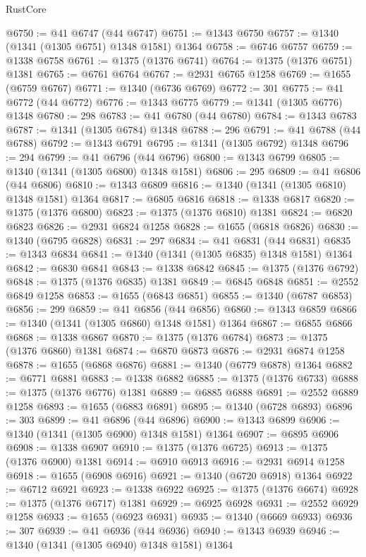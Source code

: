 \begin{lexlean}{RustCore}
\begin{coremodule}
@6750 := @41 @6747 (@44 @6747)
@6751 := @1343 @6750
@6757 := @1340 (@1341 (@1305 @6751) @1348 @1581) @1364
@6758 := @6746 @6757
@6759 := @1338 @6758
@6761 := @1375 (@1376 @6741)
@6764 := @1375 (@1376 @6751) @1381
@6765 := @6761 @6764
@6767 := @2931 @6765 @1258
@6769 := @1655 (@6759 @6767)
@6771 := @1340 (@6736 @6769)
@6772 := 301
@6775 := @41 @6772 (@44 @6772)
@6776 := @1343 @6775
@6779 := @1341 (@1305 @6776) @1348
@6780 := 298
@6783 := @41 @6780 (@44 @6780)
@6784 := @1343 @6783
@6787 := @1341 (@1305 @6784) @1348
@6788 := 296
@6791 := @41 @6788 (@44 @6788)
@6792 := @1343 @6791
@6795 := @1341 (@1305 @6792) @1348
@6796 := 294
@6799 := @41 @6796 (@44 @6796)
@6800 := @1343 @6799
@6805 := @1340 (@1341 (@1305 @6800) @1348 @1581)
@6806 := 295
@6809 := @41 @6806 (@44 @6806)
@6810 := @1343 @6809
@6816 := @1340 (@1341 (@1305 @6810) @1348 @1581) @1364
@6817 := @6805 @6816
@6818 := @1338 @6817
@6820 := @1375 (@1376 @6800)
@6823 := @1375 (@1376 @6810) @1381
@6824 := @6820 @6823
@6826 := @2931 @6824 @1258
@6828 := @1655 (@6818 @6826)
@6830 := @1340 (@6795 @6828)
@6831 := 297
@6834 := @41 @6831 (@44 @6831)
@6835 := @1343 @6834
@6841 := @1340 (@1341 (@1305 @6835) @1348 @1581) @1364
@6842 := @6830 @6841
@6843 := @1338 @6842
@6845 := @1375 (@1376 @6792)
@6848 := @1375 (@1376 @6835) @1381
@6849 := @6845 @6848
@6851 := @2552 @6849 @1258
@6853 := @1655 (@6843 @6851)
@6855 := @1340 (@6787 @6853)
@6856 := 299
@6859 := @41 @6856 (@44 @6856)
@6860 := @1343 @6859
@6866 := @1340 (@1341 (@1305 @6860) @1348 @1581) @1364
@6867 := @6855 @6866
@6868 := @1338 @6867
@6870 := @1375 (@1376 @6784)
@6873 := @1375 (@1376 @6860) @1381
@6874 := @6870 @6873
@6876 := @2931 @6874 @1258
@6878 := @1655 (@6868 @6876)
@6881 := @1340 (@6779 @6878) @1364
@6882 := @6771 @6881
@6883 := @1338 @6882
@6885 := @1375 (@1376 @6733)
@6888 := @1375 (@1376 @6776) @1381
@6889 := @6885 @6888
@6891 := @2552 @6889 @1258
@6893 := @1655 (@6883 @6891)
@6895 := @1340 (@6728 @6893)
@6896 := 303
@6899 := @41 @6896 (@44 @6896)
@6900 := @1343 @6899
@6906 := @1340 (@1341 (@1305 @6900) @1348 @1581) @1364
@6907 := @6895 @6906
@6908 := @1338 @6907
@6910 := @1375 (@1376 @6725)
@6913 := @1375 (@1376 @6900) @1381
@6914 := @6910 @6913
@6916 := @2931 @6914 @1258
@6918 := @1655 (@6908 @6916)
@6921 := @1340 (@6720 @6918) @1364
@6922 := @6712 @6921
@6923 := @1338 @6922
@6925 := @1375 (@1376 @6674)
@6928 := @1375 (@1376 @6717) @1381
@6929 := @6925 @6928
@6931 := @2552 @6929 @1258
@6933 := @1655 (@6923 @6931)
@6935 := @1340 (@6669 @6933)
@6936 := 307
@6939 := @41 @6936 (@44 @6936)
@6940 := @1343 @6939
@6946 := @1340 (@1341 (@1305 @6940) @1348 @1581) @1364

\end{coremodule}
\end{lexlean}
